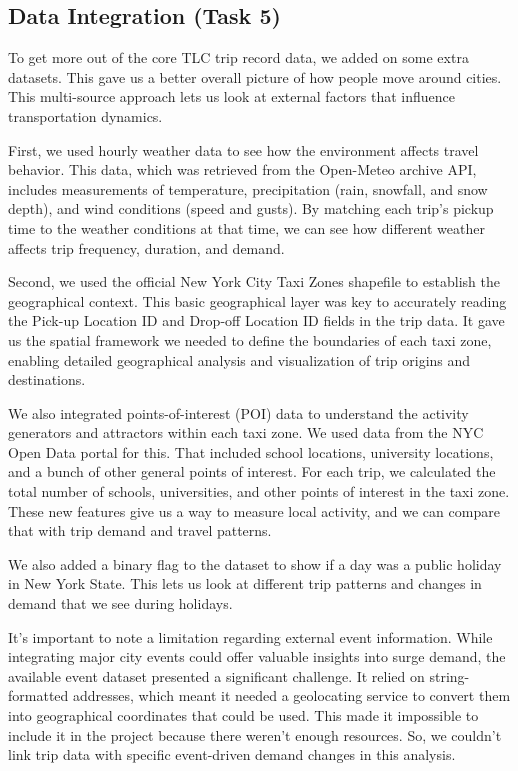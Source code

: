 \documentclass[conference]{IEEEtran}
\begin{document}
\subsection{Data Integration (Task 5)}

To get more out of the core TLC trip record data, we added on some extra datasets. This gave us a better overall picture
of how people move around cities. This multi-source approach lets us look at external factors that influence
transportation dynamics.

First, we used hourly weather data to see how the environment affects travel behavior. This data, which was retrieved
from the Open-Meteo archive API, includes measurements of temperature, precipitation (rain, snowfall, and snow depth),
and wind conditions (speed and gusts). By matching each trip's pickup time to the weather conditions at that time, we
can see how different weather affects trip frequency, duration, and demand.

Second, we used the official New York City Taxi Zones shapefile to establish the geographical context. This basic
geographical layer was key to accurately reading the Pick-up Location ID and Drop-off Location ID fields in the trip
data. It gave us the spatial framework we needed to define the boundaries of each taxi zone, enabling detailed
geographical analysis and visualization of trip origins and destinations.

We also integrated points-of-interest (POI) data to understand the activity generators and attractors within each taxi
zone. We used data from the NYC Open Data portal for this. That included school locations, university locations, and a
bunch of other general points of interest. For each trip, we calculated the total number of schools, universities, and
other points of interest in the taxi zone. These new features give us a way to measure local activity, and we can
compare that with trip demand and travel patterns.

We also added a binary flag to the dataset to show if a day was a public holiday in New York State. This lets us look at
different trip patterns and changes in demand that we see during holidays.

It's important to note a limitation regarding external event information. While integrating major city events could
offer valuable insights into surge demand, the available event dataset presented a significant challenge. It relied on
string-formatted addresses, which meant it needed a geolocating service to convert them into geographical coordinates
that could be used. This made it impossible to include it in the project because there weren't enough resources. So, we
couldn't link trip data with specific event-driven demand changes in this analysis.
\end{document}
